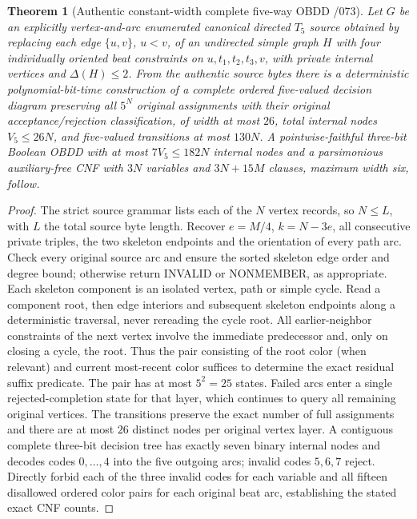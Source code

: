 \documentclass[11pt]{article}
\newtheorem{theorem}{Theorem}
\begin{document}
\begin{theorem}[Authentic constant-width complete five-way OBDD /073]
Let $G$ be an explicitly vertex-and-arc enumerated canonical directed
$T_5$ source obtained by replacing each edge $\{u,v\}$, $u<v$,
of an undirected simple graph $H$ with four individually oriented
beat constraints on $u,t_1,t_2,t_3,v$, with private internal vertices
and $\Delta(H)\le2$. From the authentic source bytes there is a
deterministic polynomial-bit-time construction of a complete ordered
five-valued decision diagram preserving all $5^N$ original assignments
with their original acceptance/rejection classification, of width
at most $26$, total internal nodes $V_5\le26N$, and
five-valued transitions at most $130N$.
A pointwise-faithful three-bit Boolean OBDD with at most $7V_5\le182N$
internal nodes and a parsimonious auxiliary-free CNF with
$3N$ variables and $3N+15M$ clauses, maximum width six, follow.
\end{theorem}
\begin{proof}
The strict source grammar lists each of the $N$ vertex records,
so $N\le L$, with $L$ the total source byte length.
Recover $e=M/4$, $k=N-3e$, all consecutive private triples,
the two skeleton endpoints and the orientation of every path arc.
Check every original source arc and ensure the sorted skeleton edge
order and degree bound; otherwise return INVALID or NONMEMBER,
as appropriate. Each skeleton component is an isolated vertex,
path or simple cycle. Read a component root, then edge interiors
and subsequent skeleton endpoints along a deterministic traversal,
never rereading the cycle root. All earlier-neighbor constraints
of the next vertex involve the immediate predecessor and,
only on closing a cycle, the root. Thus the pair consisting of
the root color (when relevant) and current most-recent color
suffices to determine the exact residual suffix predicate.
The pair has at most $5^2=25$ states. Failed arcs enter
a single rejected-completion state for that layer, which continues
to query all remaining original vertices. The transitions
preserve the exact number of full assignments and there are
at most $26$ distinct nodes per original vertex layer.
A contiguous complete three-bit decision tree has exactly seven
binary internal nodes and decodes codes $0,\ldots,4$ into
the five outgoing arcs; invalid codes $5,6,7$ reject.
Directly forbid each of the three invalid codes for each variable
and all fifteen disallowed ordered color pairs for each original
beat arc, establishing the stated exact CNF counts.
\end{proof}
\end{document}
